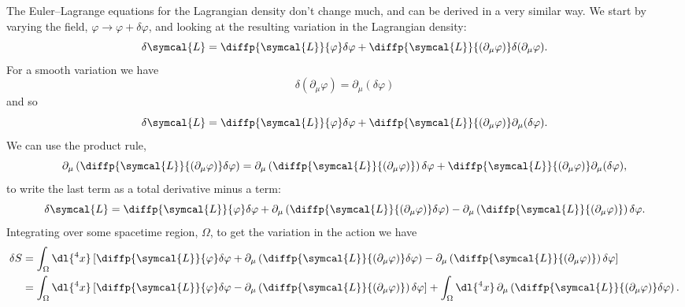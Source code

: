 \documentclass[fleqn]{NotesClass}
\newcommand{\lagrangianDensity}{\symcal{L}}
\begin{document}
    The Euler--Lagrange equations for the Lagrangian density don't change much, and can be derived in a very similar way.
    We start by varying the field, \(\varphi \to \varphi + \delta \varphi\), and looking at the resulting variation in the Lagrangian density:
    \begin{equation}
        \delta\lagrangianDensity = \diffp{\lagrangianDensity}{\varphi} \delta \varphi + \diffp{\lagrangianDensity}{(\partial_\mu \varphi)} \delta (\partial_\mu \varphi).
    \end{equation}
    For a smooth variation we have
    \begin{equation}
        \delta (\partial_\mu \varphi) = \partial_\mu (\delta \varphi)
    \end{equation}
    and so
    \begin{equation}
        \delta\lagrangianDensity = \diffp{\lagrangianDensity}{\varphi} \delta \varphi + \diffp{\lagrangianDensity}{(\partial_\mu \varphi)} \partial_\mu (\delta \varphi).
    \end{equation}
    We can use the product rule,
    \begin{equation}
        \partial_\mu \left( \diffp{\lagrangianDensity}{(\partial_\mu \varphi)} \delta \varphi \right) = \partial_\mu \left( \diffp{\lagrangianDensity}{(\partial_\mu \varphi)} \right) \delta \varphi + \diffp{\lagrangianDensity}{(\partial_\mu \varphi)} \partial_\mu (\delta \varphi),
    \end{equation}
    to write the last term as a total derivative minus a term:
    \begin{equation}
        \delta\lagrangianDensity = \diffp{\lagrangianDensity}{\varphi} \delta \varphi + \partial_\mu \left( \diffp{\lagrangianDensity}{(\partial_\mu \varphi)} \delta \varphi \right) - \partial_\mu \left( \diffp{\lagrangianDensity}{(\partial_\mu \varphi)} \right) \delta \varphi.
    \end{equation}
    Integrating over some spacetime region, \(\Omega\), to get the variation in the action we have
    \begin{align}
        \delta S &= \int_\Omega \dl{^4x} \left[ \diffp{\lagrangianDensity}{\varphi} \delta \varphi + \partial_\mu \left( \diffp{\lagrangianDensity}{(\partial_\mu \varphi)} \delta \varphi \right) - \partial_\mu\left( \diffp{\lagrangianDensity}{(\partial_\mu \varphi)} \right) \delta \varphi \right]\\
        &= \int_\Omega \dl{^4x} \left[ \diffp{\lagrangianDensity}{\varphi} \delta \varphi - \partial_\mu\left( \diffp{\lagrangianDensity}{(\partial_\mu \varphi)} \right) \delta \varphi \right] + \int_\Omega \dl{^4x} \, \partial_\mu \left( \diffp{\lagrangianDensity}{(\partial_\mu \varphi)} \delta \varphi \right).
    \end{align}
\end{document}
